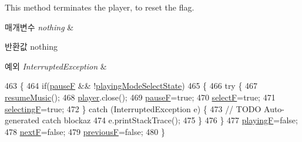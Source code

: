 This method terminates the player, to reset the flag. 


\begin{DoxyParams}{매개변수}
{\em nothing} & \\
\hline
\end{DoxyParams}
\begin{DoxyReturn}{반환값}
nothing 
\end{DoxyReturn}

\begin{DoxyExceptions}{예외}
{\em Interrupted\+Exception} & \\
\hline
\end{DoxyExceptions}

\begin{DoxyCode}
463   \{
464     \textcolor{keywordflow}{if}(\hyperlink{classkr_1_1ac_1_1kookmin_1_1cs_1_1music_1_1_music_player_a9cbd432293e5e11088c6bfb4b31db11c}{pauseF} && !\hyperlink{classkr_1_1ac_1_1kookmin_1_1cs_1_1music_1_1_music_player_ae2610567e63c44b6bba0eabdd1868e33}{playingModeSelectState})
465     \{
466       \textcolor{keywordflow}{try} \{
467         \hyperlink{classkr_1_1ac_1_1kookmin_1_1cs_1_1music_1_1_music_player_a889d56a689747ddb862ae3a76f682803}{resumeMusic}();
468         \hyperlink{classkr_1_1ac_1_1kookmin_1_1cs_1_1music_1_1_music_player_ae3ec295f2404ad30d9ff20208cda065e}{player}.close();
469         \hyperlink{classkr_1_1ac_1_1kookmin_1_1cs_1_1music_1_1_music_player_a9cbd432293e5e11088c6bfb4b31db11c}{pauseF}=\textcolor{keyword}{true};
470         \hyperlink{classkr_1_1ac_1_1kookmin_1_1cs_1_1music_1_1_music_player_a75e8d73ae2ea36cdc3c38bde7a802ca7}{selectF}=\textcolor{keyword}{true};
471         \hyperlink{classkr_1_1ac_1_1kookmin_1_1cs_1_1music_1_1_music_player_a84e908ec2c02aac3801492aed4d1ae8a}{selectingF}=\textcolor{keyword}{true};
472       \} \textcolor{keywordflow}{catch} (InterruptedException e) \{
473         \textcolor{comment}{// TODO Auto-generated catch blockaz}
474         e.printStackTrace();
475       \} 
476     \}
477     \hyperlink{classkr_1_1ac_1_1kookmin_1_1cs_1_1music_1_1_music_player_af9d89823a5f820f1592ebe2acd21f711}{playingF}=\textcolor{keyword}{false};
478     \hyperlink{classkr_1_1ac_1_1kookmin_1_1cs_1_1music_1_1_music_player_a5cbb89ee2337edc2838f332c8b5e5160}{nextF}=\textcolor{keyword}{false};
479     \hyperlink{classkr_1_1ac_1_1kookmin_1_1cs_1_1music_1_1_music_player_a2cbe57c0e490a5d3e85adff6bc53e34e}{previousF}=\textcolor{keyword}{false};
480   \}
\end{DoxyCode}


